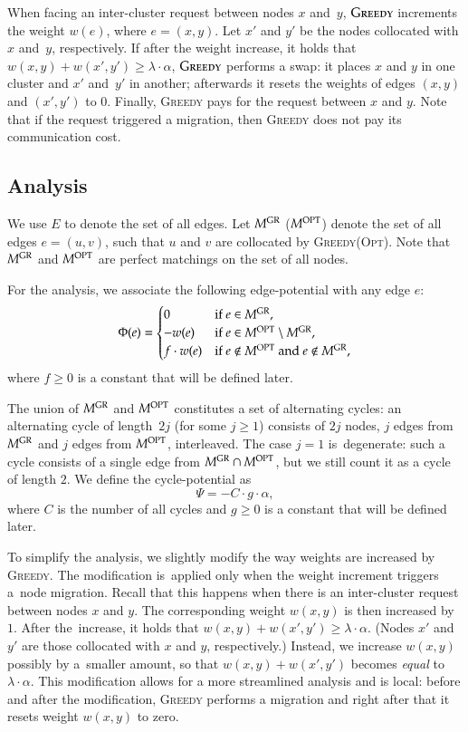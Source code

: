 \documentclass[11pt,a4paper]{scrartcl}
\newcommand{\GREEDY}{\textsc{Greedy}\xspace}
\newcommand{\MGREEDY}{M^\textsc{GR}}
\newcommand{\MOPT}{M^\textsc{OPT}}
\newcommand{\OPT}{\textsc{Opt}\xspace}
\begin{document}
When facing an inter-cluster request between nodes $x$
and~$y$, $\GREEDY$ increments the weight $w(e)$, where $e = (x,y)$. Let $x'$
and $y'$ be the nodes collocated with $x$ and~$y$, respectively. If after the
weight increase, it holds that $w(x,y) + w(x',y') \geq \lambda
\cdot \alpha$, $\GREEDY$ performs a swap: it places $x$ and $y$ in one
cluster and $x'$ and~$y'$ in another; afterwards it resets the weights of
edges $(x,y)$ and $(x',y')$ to 0. Finally, \GREEDY pays for the request
between $x$ and $y$. Note that if the request triggered a migration, then
\GREEDY does not pay its communication cost.


\subsection{Analysis}

We use $E$ to denote the set of all edges.
Let $\MGREEDY$ ($\MOPT$) denote the set of all edges $e = (u,v)$, such 
that $u$ and $v$ are collocated by \GREEDY (\OPT). 
Note that $\MGREEDY$ and $\MOPT$ are perfect matchings on the set of all nodes.

For the analysis, we associate the following edge-potential with any edge $e$:
\[
	\Phi(e) = \begin{cases}
		0 			& \textrm{if $e \in \MGREEDY$,} \\
		- w(e) 	& \textrm{if $e \in \MOPT \setminus \MGREEDY$,} \\
		f \cdot w(e) & \textrm{if $e \notin \MOPT$ and $e \notin \MGREEDY$,} \\
	\end{cases}
\]
where $f \geq 0$ is a constant that will be defined later. 

The union of $\MGREEDY$ and $\MOPT$ constitutes a set of alternating cycles:
an alternating cycle of length~$2 j$ (for some $j \geq 1$) consists of $2 j$
nodes, $j$ edges from $\MGREEDY$ and $j$ edges from $\MOPT$, interleaved. The
case $j = 1$ is~degenerate: such a cycle consists of a single edge from $\MGREEDY
\cap \MOPT$, but we still count it as a cycle of length $2$. We define the
cycle-potential as
\[
	\Psi = - C \cdot g \cdot \alpha,
\]
where $C$ is the number of all cycles and $g \geq 0$ is a constant that will
be defined later.

To simplify the analysis, we slightly modify the way weights are increased by
\GREEDY. The modification is~applied only when the weight increment triggers 
a~node migration. Recall that this happens when there is an inter-cluster
request between nodes $x$ and $y$. The corresponding weight $w(x,y)$ is then
increased by $1$. After the~increase, it holds that $w(x,y) + w(x',y') \geq
\lambda \cdot \alpha$. (Nodes $x'$ and $y'$ are those collocated with $x$ and $y$,
respectively.) Instead, we increase $w(x,y)$ possibly by a~smaller amount, so
that $w(x,y) + w(x',y')$ becomes \emph{equal} to $\lambda \cdot \alpha$. This
modification allows for a more streamlined analysis and is local: before and
after the modification, \GREEDY performs a migration and right after that
it resets weight $w(x,y)$ to zero.
\end{document}
